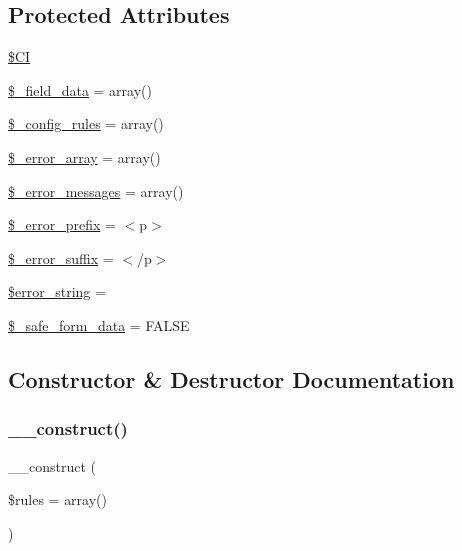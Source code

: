 \subsection*{Protected Attributes}
\begin{DoxyCompactItemize}
\item 
\mbox{\hyperlink{class_c_i___form__validation_ae0314d046ddf7fcfaec03222977427d3}{\$\+CI}}
\item 
\mbox{\hyperlink{class_c_i___form__validation_a8263493b8d14294371f1f157ea632df5}{\$\+\_\+field\+\_\+data}} = array()
\item 
\mbox{\hyperlink{class_c_i___form__validation_aa1b63acebe8880c36ea51e11a57eb0d3}{\$\+\_\+config\+\_\+rules}} = array()
\item 
\mbox{\hyperlink{class_c_i___form__validation_a50e8f829178352ca2ea7777cb491b7f8}{\$\+\_\+error\+\_\+array}} = array()
\item 
\mbox{\hyperlink{class_c_i___form__validation_a04bf2e3e86d96dde4d4353c053b81473}{\$\+\_\+error\+\_\+messages}} = array()
\item 
\mbox{\hyperlink{class_c_i___form__validation_ad4e512c18b95689885fcee10b5489901}{\$\+\_\+error\+\_\+prefix}} = \textquotesingle{}$<$p$>$\textquotesingle{}
\item 
\mbox{\hyperlink{class_c_i___form__validation_ab5c737026065a0b4c7bdd5414eec6a6d}{\$\+\_\+error\+\_\+suffix}} = \textquotesingle{}$<$/p$>$\textquotesingle{}
\item 
\mbox{\hyperlink{class_c_i___form__validation_a22323b47b58139586ed855d04138d212}{\$error\+\_\+string}} = \textquotesingle{}\textquotesingle{}
\item 
\mbox{\hyperlink{class_c_i___form__validation_ad767d36cd2cc57999044f0a94a0e470f}{\$\+\_\+safe\+\_\+form\+\_\+data}} = F\+A\+L\+SE
\end{DoxyCompactItemize}


\subsection{Constructor \& Destructor Documentation}
\mbox{\label{class_c_i___form__validation_ac7224a1f92da249b312d1400c459ba83}} 
\subsubsection{\texorpdfstring{\+\_\+\+\_\+construct()}{\_\_construct()}}
{\footnotesize\ttfamily \+\_\+\+\_\+construct (\begin{DoxyParamCaption}\item[{}]{\$rules = {\ttfamily array()} }\end{DoxyParamCaption})}

